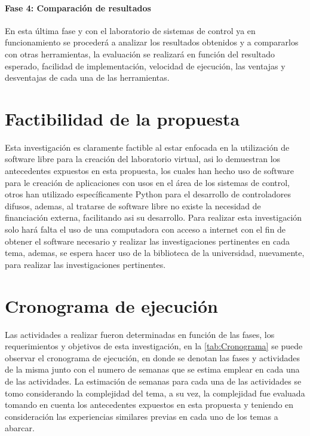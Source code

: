 	\paragraph{Fase 4: Comparación de resultados}
		
		En esta última fase y con el laboratorio de sistemas de control ya en funcionamiento se procederá a analizar los resultados obtenidos y a compararlos con otras herramientas, la evaluación se realizará en función del resultado esperado, facilidad de implementación, velocidad de ejecución, las ventajas y desventajas de cada una de las herramientas.

\section{Factibilidad de la propuesta}

	Esta investigación es claramente factible al estar enfocada en la utilización de software libre para la creación del laboratorio virtual, asi lo demuestran los antecedentes expuestos en esta propuesta, los cuales han hecho uso de software para le creación de aplicaciones con usos en el área de los sistemas de control, otros han utilizado específicamente Python para el desarrollo de controladores difusos, ademas, al tratarse de software libre no existe la necesidad de financiación externa, facilitando asi su desarrollo. Para realizar esta investigación solo hará falta el uso de una computadora con acceso a internet con el fin de obtener el software necesario y realizar las investigaciones pertinentes en cada tema, ademas, se espera hacer uso de la biblioteca de la universidad, nuevamente, para realizar las investigaciones pertinentes.
	
\section{Cronograma de ejecución}

	Las actividades a realizar fueron determinadas en función de las fases, los requerimientos y objetivos de esta investigación, en la \cref{tab:Cronograma} se puede observar el cronograma de ejecución, en donde se denotan las fases y actividades de la misma junto con el numero de semanas que se estima emplear en cada una de las actividades. La estimación de semanas para cada una de las actividades se tomo considerando la complejidad del tema, a su vez, la complejidad fue evaluada tomando en cuenta los antecedentes expuestos en esta propuesta y teniendo en consideración las experiencias similares previas en cada uno de los temas a abarcar.

